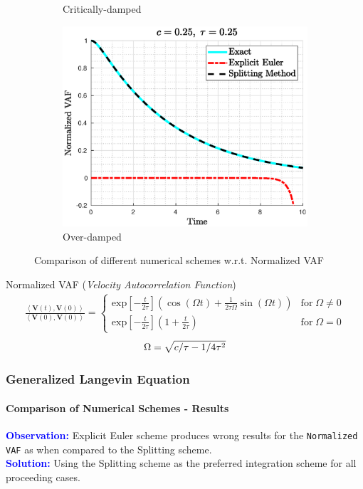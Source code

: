 \documentclass[a4paper,10pt]{beamer}
\newcommand{\BS}[1]{\boldsymbol{#1}}
\newcommand{\sqb}[1]{\left[ #1 \right]}
\newcommand{\rb}[1]{\left( #1 \right)}
\newcommand{\angbrac}[1]{\left \langle #1 \right \rangle}
\begin{document}
\begin{frame}
\begin{figure}[H]
\begin{subfigure}[b]{0.326\linewidth}
				\caption{Critically-damped}
			\end{subfigure}
			\begin{subfigure}[b]{0.326\linewidth}
				\includegraphics[width=\linewidth]{./Plots/CaseStudy/Overdamped.eps}
				\caption{Over-damped}
			\end{subfigure}
			\caption{Comparison of different numerical schemes w.r.t. Normalized VAF}
		\end{figure}
		\vspace{-0.5cm}
		\begin{alertblock}{Normalized VAF (\textit{Velocity Autocorrelation Function})}
			\begin{align}
				\frac{\angbrac{\BS{V}(t),\BS{V}(0)}}{\angbrac{\BS{V}(0),\BS{V}(0)}} = 
				\begin{cases}
				\text{exp} \sqb{-\frac{t}{2 \tau}} \rb{\cos\rb{\Omega t} + \frac{1}{2\tau\Omega} \sin\rb{\Omega t}}  &\text{for} \; \Omega \neq 0 \\
				\text{exp} \sqb{-\frac{t}{2 \tau}} \rb{1 + \frac{t}{2 \tau}} &\text{for} \; \Omega = 0
				\end{cases}
			\end{align}
			\begin{gather}
				\notag
				\Omega = \sqrt{c/\tau - 1/4\tau^{2}}
			\end{gather}
		\end{alertblock}
	\end{frame}
	\begin{frame}
		\frametitle{Generalized Langevin Equation}
		\framesubtitle{Comparison of Numerical Schemes - Results}
		\large
		\textcolor{blue}{\textbf{Observation:}}
		{Explicit Euler scheme produces wrong results for the \texttt{Normalized VAF} as when compared to the Splitting scheme.} \\
		\vspace{0.25cm}
		\textcolor{blue}{\textbf{Solution:}}
		{Using the Splitting scheme as the preferred integration scheme for all proceeding cases.}
	\end{frame}
	
\end{document}
